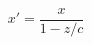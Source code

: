 \documentclass{article}
\begin{document}
\thispagestyle{empty}


$$x' = \frac{x}{1-z/c}$$
\end{document}
